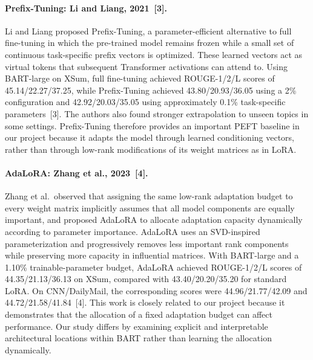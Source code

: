 \documentclass[11pt, letterpaper]{article}
\begin{document}
\paragraph{Prefix-Tuning: Li and Liang, 2021~[3].}
Li and Liang proposed Prefix-Tuning, a parameter-efficient alternative to
full fine-tuning in which the pre-trained model remains frozen while a small
set of continuous task-specific prefix vectors is optimized. These learned
vectors act as virtual tokens that subsequent Transformer activations can
attend to. Using BART-large on XSum, full fine-tuning achieved
ROUGE-1/2/L scores of 45.14/22.27/37.25, while Prefix-Tuning achieved
43.80/20.93/36.05 using a 2\% configuration and
42.92/20.03/35.05 using approximately 0.1\% task-specific parameters~[3].
The authors also found stronger extrapolation to unseen topics in some
settings. Prefix-Tuning therefore provides an important PEFT baseline in our
project because it adapts the model through learned conditioning vectors,
rather than through low-rank modifications of its weight matrices as in LoRA.

\paragraph{AdaLoRA: Zhang et al., 2023~[4].}
Zhang et al.\ observed that assigning the same low-rank adaptation budget to
every weight matrix implicitly assumes that all model components are equally
important, and proposed AdaLoRA to allocate adaptation capacity dynamically
according to parameter importance. AdaLoRA uses an SVD-inspired
parameterization and progressively removes less important rank components
while preserving more capacity in influential matrices. With BART-large and a
1.10\% trainable-parameter budget, AdaLoRA achieved ROUGE-1/2/L scores of
44.35/21.13/36.13 on XSum, compared with 43.40/20.20/35.20 for standard
LoRA. On CNN/DailyMail, the corresponding scores were
44.96/21.77/42.09 and 44.72/21.58/41.84~[4]. This work is closely related
to our project because it demonstrates that the allocation of a fixed
adaptation budget can affect performance. Our study differs by examining
explicit and interpretable architectural locations within BART rather than
learning the allocation dynamically.
\end{document}
